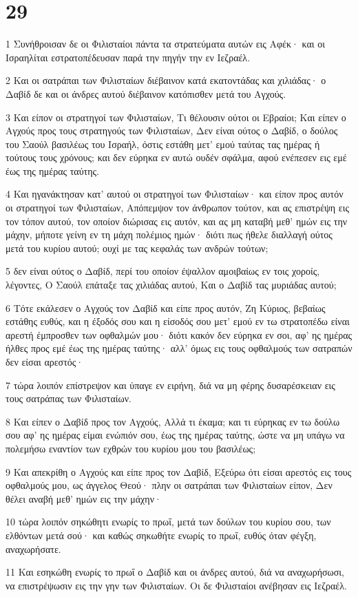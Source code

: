 \chapter{29}

\par 1 Συνήθροισαν δε οι Φιλισταίοι πάντα τα στρατεύματα αυτών εις Αφέκ· και οι Ισραηλίται εστρατοπέδευσαν παρά την πηγήν την εν Ιεζραέλ.
\par 2 Και οι σατράπαι των Φιλισταίων διέβαινον κατά εκατοντάδας και χιλιάδας· ο Δαβίδ δε και οι άνδρες αυτού διέβαινον κατόπισθεν μετά του Αγχούς.
\par 3 Και είπον οι στρατηγοί των Φιλισταίων, Τι θέλουσιν ούτοι οι Εβραίοι; Και είπεν ο Αγχούς προς τους στρατηγούς των Φιλισταίων, Δεν είναι ούτος ο Δαβίδ, ο δούλος του Σαούλ βασιλέως του Ισραήλ, όστις εστάθη μετ' εμού ταύτας τας ημέρας ή τούτους τους χρόνους; και δεν εύρηκα εν αυτώ ουδέν σφάλμα, αφού ενέπεσεν εις εμέ έως της ημέρας ταύτης.
\par 4 Και ηγανάκτησαν κατ' αυτού οι στρατηγοί των Φιλισταίων· και είπον προς αυτόν οι στρατηγοί των Φιλισταίων, Απόπεμψον τον άνθρωπον τούτον, και ας επιστρέψη εις τον τόπον αυτού, τον οποίον διώρισας εις αυτόν, και ας μη καταβή μεθ' ημών εις την μάχην, μήποτε γείνη εν τη μάχη πολέμιος ημών· διότι πως ήθελε διαλλαγή ούτος μετά του κυρίου αυτού; ουχί με τας κεφαλάς των ανδρών τούτων;
\par 5 δεν είναι ούτος ο Δαβίδ, περί του οποίον έψαλλον αμοιβαίως εν τοις χοροίς, λέγοντες, Ο Σαούλ επάταξε τας χιλιάδας αυτού, Και ο Δαβίδ τας μυριάδας αυτού;
\par 6 Τότε εκάλεσεν ο Αγχούς τον Δαβίδ και είπε προς αυτόν, Ζη Κύριος, βεβαίως εστάθης ευθύς, και η έξοδός σου και η είσοδός σου μετ' εμού εν τω στρατοπέδω είναι αρεστή έμπροσθεν των οφθαλμών μου· διότι κακόν δεν εύρηκα εν σοι, αφ' ης ημέρας ήλθες προς εμέ έως της ημέρας ταύτης· αλλ' όμως εις τους οφθαλμούς των σατραπών δεν είσαι αρεστός·
\par 7 τώρα λοιπόν επίστρεψον και ύπαγε εν ειρήνη, διά να μη φέρης δυσαρέσκειαν εις τους σατράπας των Φιλισταίων.
\par 8 Και είπεν ο Δαβίδ προς τον Αγχούς, Αλλά τι έκαμα; και τι εύρηκας εν τω δούλω σου αφ' ης ημέρας είμαι ενώπιόν σου, έως της ημέρας ταύτης, ώστε να μη υπάγω να πολεμήσω εναντίον των εχθρών του κυρίου μου του βασιλέως;
\par 9 Και απεκρίθη ο Αγχούς και είπε προς τον Δαβίδ, Εξεύρω ότι είσαι αρεστός εις τους οφθαλμούς μου, ως άγγελος Θεού· πλην οι σατράπαι των Φιλισταίων είπον, Δεν θέλει αναβή μεθ' ημών εις την μάχην·
\par 10 τώρα λοιπόν σηκώθητι ενωρίς το πρωΐ, μετά των δούλων του κυρίου σου, των ελθόντων μετά σού· και καθώς σηκωθήτε ενωρίς το πρωΐ, ευθύς όταν φέγξη, αναχωρήσατε.
\par 11 Και εσηκώθη ενωρίς το πρωΐ ο Δαβίδ και οι άνδρες αυτού, διά να αναχωρήσωσι, να επιστρέψωσιν εις την γην των Φιλισταίων. Οι δε Φιλισταίοι ανέβησαν εις Ιεζραέλ.

